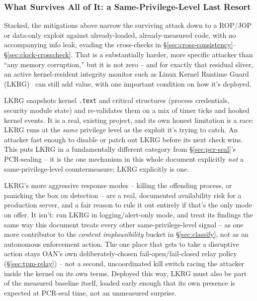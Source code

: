 \documentclass[11pt,a4paper]{article}
\begin{document}
\subsubsection{What Survives All of It: a Same-Privilege-Level Last Resort}
\label{sec:lkrg-report-only}

Stacked, the mitigations above narrow the surviving attack down to a
ROP/JOP or data-only exploit against already-loaded, already-measured
code, with no accompanying info leak, evading the cross-checks in
\S\ref{sec:cross-consistency}--\S\ref{sec:clock-crosscheck}. That is a
substantially harder, more specific attacker than ``any memory
corruption,'' but it is not zero -- and for exactly that residual
sliver, an active kernel-resident integrity monitor such as Linux
Kernel Runtime Guard (LKRG)~\cite{lkrg} can still add value, with one important
condition on how it's deployed.

LKRG snapshots kernel \texttt{.text} and critical structures (process
credentials, security module state) and re-validates them on a mix of
timer ticks and hooked kernel events. It is a real, existing project,
and its own honest limitation is a race: LKRG runs at the \emph{same}
privilege level as the exploit it's trying to catch. An attacker fast
enough to disable or patch out LKRG before its next check wins. This
puts LKRG in a fundamentally different category from
\S\ref{sec:pcr-seal}'s PCR-sealing -- it is the one mechanism in this
whole document explicitly \emph{not} a same-privilege-level
countermeasure; LKRG explicitly is one.

\begin{notebox}
LKRG's more aggressive response modes -- killing the offending process,
or panicking the box on detection -- are a real, documented
availability risk for a production server, and a fair reason to rule
it out entirely if that's the only mode on offer. It isn't: run LKRG in
logging/alert-only mode, and treat its findings the same way this
document treats every other same-privilege-level signal -- as one more
contributor to the \emph{content implausibility} bucket in
\S\ref{sec:classify}, not as an autonomous enforcement action. The one
place that gets to take a disruptive action stays OAN's own
deliberately-chosen fail-open/fail-closed relay policy
(\S\ref{sec:tpm-relay}) -- not a second, uncoordinated kill switch
racing the attacker inside the kernel on its own terms. Deployed this
way, LKRG must also be part of the measured baseline itself, loaded
early enough that its own presence is expected at PCR-seal time, not
an unmeasured surprise.
\end{notebox}
\end{document}
